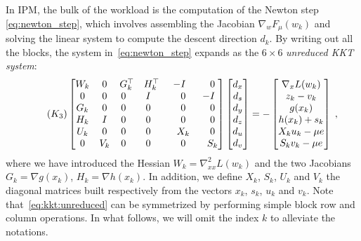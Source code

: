 In IPM, the bulk of the workload is the computation of the Newton
step \eqref{eq:newton_step}, which involves assembling the Jacobian
$\nabla_w F_\mu(w_k)$ and solving the linear system to compute
the descent direction $d_k$.
By writing out all the blocks, the system in~\eqref{eq:newton_step} expands as the $6 \times 6$
\emph{unreduced KKT system}:
\begin{equation}
  \label{eq:kkt:unreduced}
  \setlength\arraycolsep{5pt}
  \tag{$K_3$}
  \begin{bmatrix}
    W_k & 0   & G_k^\top         & H_k^\top         & -I             & \phantom{-}0 \\
    0   & 0   & 0\phantom{^\top} & I\phantom{^\top} & \phantom{-}0   & -I           \\
    G_k & 0   & 0\phantom{^\top} & 0\phantom{^\top} & \phantom{-}0   & \phantom{-}0 \\
    H_k & I   & 0\phantom{^\top} & 0\phantom{^\top} & \phantom{-}0   & \phantom{-}0 \\
    U_k & 0   & 0\phantom{^\top} & 0\phantom{^\top} & \phantom{-}X_k & \phantom{-}0 \\
    0   & V_k & 0\phantom{^\top} & 0\phantom{^\top} & \phantom{-}0   & \phantom{-}S_k
  \end{bmatrix}
  \begin{bmatrix}
    d_x \\
    d_s \\
    d_y \\
    d_z \\
    d_u \\
    d_v
  \end{bmatrix}
  = - \begin{bmatrix}
    \nabla_x L(w_k) \\
       z_k - v_k  \\
       g(x_k)  \\
       h(x_k) + s_k  \\
       X_k u_k - \mu e  \\
       S_k v_k - \mu e
  \end{bmatrix} \; ,
\end{equation}
where we have introduced the Hessian $W_k = \nabla^2_{x x} L(w_k)$ and
the two Jacobians $G_k = \nabla g(x_k)$, $H_k = \nabla h(x_k)$.
In addition, we define $X_k$, $S_k$, $U_k$ and $V_k$ the diagonal matrices built respectively
from the vectors $x_k$, $s_k$, $u_k$ and $v_k$.
Note that~\eqref{eq:kkt:unreduced} can be symmetrized by performing simple block row and column operations.
In what follows, we will omit the index $k$ to alleviate the notations.

